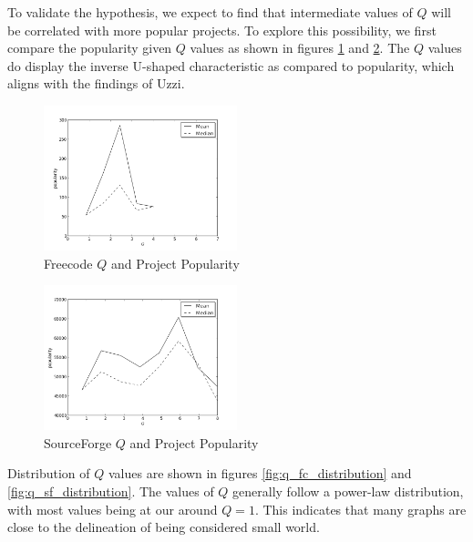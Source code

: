\documentclass{proc}
\begin{document}
To validate the hypothesis, we expect to find that intermediate values of $Q$ will be correlated with more popular projects. To explore this possibility, we first compare the popularity given $Q$ values as shown in figures \ref{fig:q_fc_graph} and \ref{fig:q_sf_graph}. The $Q$ values do display the inverse U-shaped characteristic as compared to popularity, which aligns with the findings of Uzzi\cite{uzzi2005collaboration}.

\begin{figure}
\begin{center}
\includegraphics[width=0.5\textwidth]{images/freecode-graph.png}
\end{center}
\caption{Freecode $Q$ and Project Popularity}
\label{fig:q_fc_graph}
\end{figure}

\begin{figure}
\begin{center}
\includegraphics[width=0.5\textwidth]{images/sf-graph.png}
\end{center}
\caption{SourceForge $Q$ and Project Popularity}
\label{fig:q_sf_graph}
\end{figure}

Distribution of $Q$ values are shown in figures \ref{fig:q_fc_distribution} and \ref{fig:q_sf_distribution}. The values of $Q$ generally follow a power-law distribution, with most values being at our around {$Q = 1$}. This indicates that many graphs are close to the delineation of being considered small world\cite{humphries2008network}.
\end{document}
